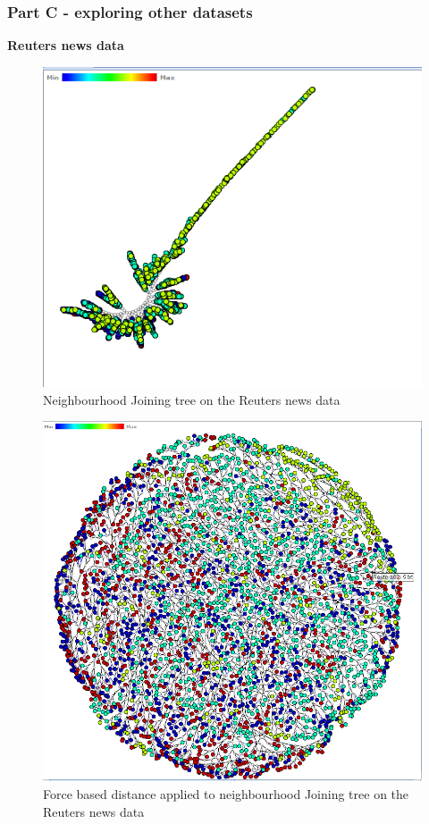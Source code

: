 \documentclass[ 10pt ]{fphw}
\begin{document}
\subsubsection*{Part C - exploring other datasets}

\vspace{0.5cm} 

\textbf{Reuters news data}

\begin{center}
\begin{figure}[H]
    \centering
	\includegraphics[width=0.65\columnwidth]{task2c/reutersNJ.PNG} 
	\caption{Neighbourhood Joining tree on the Reuters news data}
	\label{fig:retunj}
	\end{figure}
\end{center}

\begin{center}
\begin{figure}[H]
    \centering
	\includegraphics[width=0.65\columnwidth]{task2c/reutersNJ-FB.PNG} 
	\caption{Force based distance applied to neighbourhood Joining tree on the Reuters news data}
	\label{fig:retunjfb}
	\end{figure}
\end{center}
\end{document}
